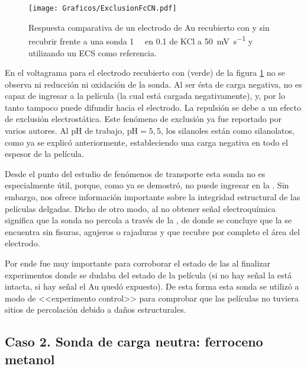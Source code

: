 			\begin{figure}[ht]
				\centering
		 	    \texttt{[image: Graficos/ExclusionFcCN.pdf]}
		        \caption[Exclusión electrostática en \pdmF]{Respuesta comparativa de un electrodo de Au recubierto con \pdmF\space y sin recubrir frente a una sonda \fe\space \SI{1}{\milli\Molar} en \SI{0.1}{\Molar} de KCl a \SI{50}{\milli\volt\per\second} y utilizando un ECS como referencia.}
		        \label{fig:exclusion_vs_Au}
		      	\end{figure}
	
	 En el voltagrama para el electrodo recubierto con \pdmF\space (verde) de la figura \ref{fig:exclusion_vs_Au} no se observa ni reducción ni oxidación de la sonda. Al ser ésta de carga negativa, no es capaz de ingresar a la película (la cual está cargada negativamente), y, por lo tanto tampoco puede difundir hacia el electrodo. La repulsión se debe a un efecto de exclusión electrostática. Este fenómeno de exclusión ya fue reportado por varios autores\cite{alberti2015,schmuhl2005,Andrieu-Brunsen2015,brunsen2011}. Al pH de trabajo, $\text{pH}=5,5$, los silanoles están como silanolatos, como ya se explicó anteriormente, estableciendo una carga negativa en todo el espesor de la película.

	 Desde el punto del estudio de fenómenos de  transporte esta sonda no es especialmente útil, porque, como ya se demostró, no puede ingresar en la \pdm. Sin embargo, nos ofrece información importante sobre la integridad estructural de las películas delgadas. Dicho de otro modo, al no obtener señal electroquímica significa que la sonda no percola a través de la \pdm, de donde se concluye que la \pdm\space se encuentra sin fisuras, agujeros o rajaduras y que recubre por completo el área del electrodo. 

	 Por ende fue muy importante para corroborar el estado de las \pdm\space al finalizar experimentos donde se dudaba del estado de la película (si no hay señal la \pdm\space está intacta, si hay señal el Au quedó expuesto). De esta forma esta sonda se utilizó a modo de <<experimento control>> para comprobar que las películas no tuviera sitios de percolación debido a daños estructurales.

	\subsection{Caso 2. Sonda de carga neutra: ferroceno metanol}

